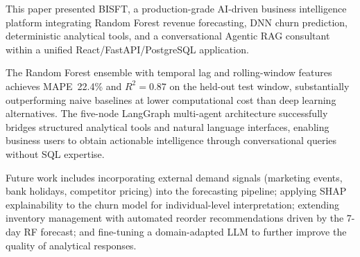 \documentclass[conference]{IEEEtran}
\begin{document}
This paper presented BISFT, a production-grade AI-driven business intelligence
platform integrating Random Forest revenue forecasting, DNN churn prediction,
deterministic analytical tools, and a conversational Agentic RAG consultant
within a unified React/FastAPI/PostgreSQL application.

The Random Forest ensemble with temporal lag and rolling-window features achieves
MAPE~22.4\% and $R^{2}\!=\!0.87$ on the held-out test window, substantially
outperforming naive baselines at lower computational cost than deep learning
alternatives.  The five-node LangGraph multi-agent architecture successfully bridges
structured analytical tools and natural language interfaces, enabling business users
to obtain actionable intelligence through conversational queries without SQL expertise.

Future work includes incorporating external demand signals (marketing events,
bank holidays, competitor pricing) into the forecasting pipeline; applying SHAP
explainability to the churn model for individual-level interpretation; extending
inventory management with automated reorder recommendations driven by the 7-day RF
forecast; and fine-tuning a domain-adapted LLM to further improve the quality of
analytical responses.
\end{document}
